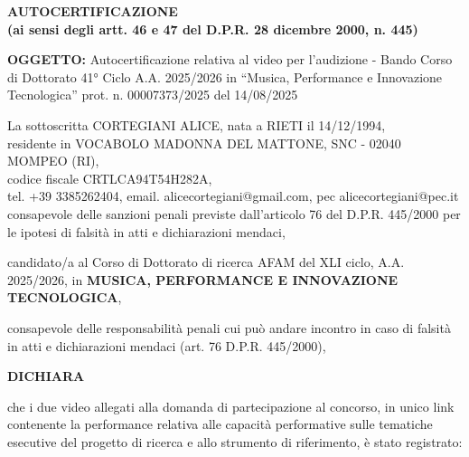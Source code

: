 \documentclass[a4paper,11pt]{article}
\begin{document}
\begin{center}
    \Large\textbf{AUTOCERTIFICAZIONE}\\
    \large\textbf{(ai sensi degli artt. 46 e 47 del D.P.R. 28 dicembre 2000, n. 445)}
    \vspace{0.5cm}
\end{center}

\noindent\textbf{OGGETTO:} Autocertificazione relativa al video per l'audizione - Bando Corso di Dottorato 41° Ciclo A.A. 2025/2026 in ``Musica, Performance e Innovazione Tecnologica'' prot. n. 00007373/2025 del 14/08/2025

\vspace{1cm}

\noindent La sottoscritta CORTEGIANI ALICE, nata a RIETI il 14/12/1994,\\
residente in VOCABOLO MADONNA DEL MATTONE, SNC - 02040 MOMPEO (RI),\\ codice fiscale CRTLCA94T54H282A,\\
tel. +39 3385262404, email. alicecortegiani@gmail.com, pec alicecortegiani@pec.it\\
consapevole delle sanzioni penali previste dall'articolo 76 del D.P.R. 445/2000 per le ipotesi di falsità in atti e dichiarazioni mendaci,

\vspace{0.8cm}

\noindent candidato/a al Corso di Dottorato di ricerca AFAM del XLI ciclo, A.A. 2025/2026, in \textbf{MUSICA, PERFORMANCE E INNOVAZIONE TECNOLOGICA},

\vspace{0.5cm}

\noindent consapevole delle responsabilità penali cui può andare incontro in caso di falsità in atti e dichiarazioni mendaci (art. 76 D.P.R. 445/2000),

\vspace{0.8cm}

\begin{center}
    \textbf{DICHIARA}
\end{center}

\vspace{0.5cm}

\noindent che i due video allegati alla domanda di partecipazione al concorso, in unico link contenente la performance relativa alle capacità performative sulle tematiche esecutive del progetto di ricerca e allo strumento di riferimento, è stato registrato:

\vspace{0.8cm}
\end{document}
